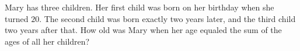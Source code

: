 Mary has three children. Her first child was born on her birthday when she turned $20$. The second child was born exactly two years later, and the third child two years after that. How old was Mary when her age equaled the sum of the ages of all her children?
